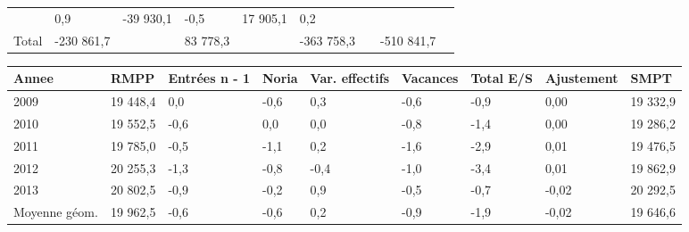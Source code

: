\begin{longtable}[]{@{}lllllllll@{}}
\begin{minipage}[t]{0.16\columnwidth}
\end{minipage} & \begin{minipage}[t]{0.06\columnwidth}\raggedright
0,9\strut
\end{minipage} & \begin{minipage}[t]{0.12\columnwidth}\raggedright
-39 930,1\strut
\end{minipage} & \begin{minipage}[t]{0.06\columnwidth}\raggedright
-0,5\strut
\end{minipage} & \begin{minipage}[t]{0.09\columnwidth}\raggedright
17 905,1\strut
\end{minipage} & \begin{minipage}[t]{0.06\columnwidth}\raggedright
0,2\strut
\end{minipage}\tabularnewline
\begin{minipage}[t]{0.05\columnwidth}\raggedright
Total\strut
\end{minipage} & \begin{minipage}[t]{0.10\columnwidth}\raggedright
-230 861,7\strut
\end{minipage} & \begin{minipage}[t]{0.06\columnwidth}\raggedright
\strut
\end{minipage} & \begin{minipage}[t]{0.16\columnwidth}\raggedright
83 778,3\strut
\end{minipage} & \begin{minipage}[t]{0.06\columnwidth}\raggedright
\strut
\end{minipage} & \begin{minipage}[t]{0.12\columnwidth}\raggedright
-363 758,3\strut
\end{minipage} & \begin{minipage}[t]{0.06\columnwidth}\raggedright
\strut
\end{minipage} & \begin{minipage}[t]{0.09\columnwidth}\raggedright
-510 841,7\strut
\end{minipage} & \begin{minipage}[t]{0.06\columnwidth}\raggedright
\strut
\end{minipage}\tabularnewline
\bottomrule
\end{longtable}

\begin{longtable}[]{@{}lllllllll@{}}
\toprule
Annee & RMPP & Entrées n - 1 & Noria & Var. effectifs & Vacances & Total
E/S & Ajustement & SMPT\tabularnewline
\midrule
\endhead
2009 & 19 448,4 & 0,0 & -0,6 & 0,3 & -0,6 & -0,9 & 0,00 & 19
332,9\tabularnewline
2010 & 19 552,5 & -0,6 & 0,0 & 0,0 & -0,8 & -1,4 & 0,00 & 19
286,2\tabularnewline
2011 & 19 785,0 & -0,5 & -1,1 & 0,2 & -1,6 & -2,9 & 0,01 & 19
476,5\tabularnewline
2012 & 20 255,3 & -1,3 & -0,8 & -0,4 & -1,0 & -3,4 & 0,01 & 19
862,9\tabularnewline
2013 & 20 802,5 & -0,9 & -0,2 & 0,9 & -0,5 & -0,7 & -0,02 & 20
292,5\tabularnewline
Moyenne géom. & 19 962,5 & -0,6 & -0,6 & 0,2 & -0,9 & -1,9 & -0,02 & 19
646,6\tabularnewline
\bottomrule
\end{longtable}


